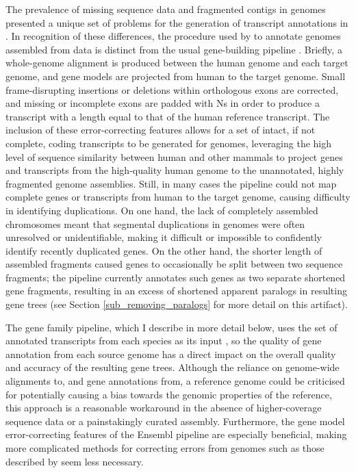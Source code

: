 The prevalence of missing sequence data and fragmented contigs in \lcv
genomes presented a unique set of problems for the generation of
transcript annotations in \ens. In recognition of these differences,
the procedure used by \cmp to annotate genomes assembled from \lcv
data is distinct from the usual gene-building pipeline
\citep{Hubbard2007}. Briefly, a whole-genome alignment is produced
between the human genome and each \lcv target genome, and gene models
are projected from human to the target genome. Small frame-disrupting
insertions or deletions within orthologous exons are corrected, and
missing or incomplete exons are padded with Ns in order to produce a
transcript with a length equal to that of the human reference
transcript. The inclusion of these error-correcting features allows
for a set of intact, if not complete, coding transcripts to be
generated for \lcv genomes, leveraging the high level of sequence
similarity between human and other \euth mammals to project genes
and transcripts from the high-quality human genome to the unannotated,
highly fragmented \lcv genome assemblies. Still, in many cases the
\ens pipeline could not map complete genes or transcripts from human
to the target genome, causing difficulty in identifying
duplications. On one hand, the lack of completely assembled
chromosomes meant that segmental duplications in \lcv genomes were
often unresolved or unidentifiable, making it difficult or impossible
to confidently identify recently duplicated genes. On the other hand,
the shorter length of assembled fragments caused genes to occasionally
be split between two sequence fragments; the \ens pipeline currently
annotates such genes as two separate shortened gene fragments,
resulting in an excess of shortened apparent paralogs in resulting
gene trees (see Section \ref{sub_removing_paralogs} for more detail on
this artifact).

The \cmp gene family pipeline, which I describe in more detail below,
uses the set of annotated transcripts from each species as its input
\citep{Vilella2009}, so the quality of gene annotation from each
source genome has a direct impact on the overall quality and accuracy
of the resulting gene trees. Although the reliance on genome-wide
alignments to, and gene annotations from, a reference genome could be
criticised for potentially causing a bias towards the genomic
properties of the reference, this approach is a reasonable workaround
in the absence of higher-coverage sequence data or a painstakingly
curated assembly. Furthermore, the gene model error-correcting
features of the Ensembl pipeline are especially beneficial, making
more complicated methods for correcting errors from \lcv genomes such
as those described by \citep{Hubisz2011} seem less necessary.

